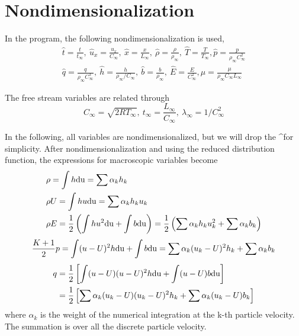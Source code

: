 \documentclass[a4paper]{book}
\begin{document}
\section{Nondimensionalization}
In the program, the following nondimensionalization is used,
\begin{gather*}
    \hat t=\frac{t}{t_\infty},\ \hat u_x=\frac{u_x}{C_\infty},\ \hat x=\frac{x}{L_\infty},\ \hat \rho=\frac{\rho}{\rho_\infty},\ \hat T=\frac{T}{T_\infty}, \hat p=\frac{p}{\rho_\infty C_\infty^2} \\
    \hat q=\frac{q}{\rho_\infty C_\infty^3},\ \hat h=\frac{h}{\rho_\infty/C_\infty},\ \hat b=\frac{b}{\rho_\infty},\ \hat E=\frac{E}{C_\infty^2}, \hat\mu = \frac{\mu}{\rho_\infty C_\infty L_\infty}
\end{gather*}

The free stream variables are related through
$$C_\infty=\sqrt{2RT_\infty},\ t_\infty=\frac{L_\infty}{C_\infty},\ \lambda_\infty=1/C_\infty^2$$

In the following, all variables are nondimensionalized, but we will drop the \textasciicircum for simplicity. After nondimensionalization and using the reduced distribution function, the expressions for macroscopic variables become
\begin{equation} 
    \label{eq:conserved_var}
    \begin{aligned}
        &\rho=\int h{\rm du}=\sum\alpha_k h_k\\
        &\rho U=\int hu{\rm du}=\sum\alpha_k h_k u_k\\
        &\rho E=\frac{1}{2}\left(\int hu^2{\rm du}+\int b{\rm du}\right)=\frac{1}{2}\left(\sum\alpha_k h_k u_k^2+\sum\alpha_k b_k\right)
    \end{aligned}
\end{equation}
\begin{equation} 
    \frac{K+1}{2}p=\int(u-U)^2h{\rm du}+\int b{\rm du}=\sum\alpha_k(u_k-U)^2 h_k+\sum\alpha_k b_k
\end{equation}
\begin{equation} 
    \label{eq:heatflux}
    \begin{aligned}
        q&=\frac{1}{2}\left[\int(u-U)(u-U)^2h{\rm du}+\int(u-U)b{\rm du}\right]\\
         &=\frac{1}{2}\left[\sum\alpha_k (u_k-U)(u_k-U)^2 h_k+\sum\alpha_k (u_k-U)b_k\right]
    \end{aligned}
\end{equation}
where $\alpha_k$ is the weight of the numerical integration at the k-th particle velocity. The summation is over all the discrete particle velocity.
\end{document}
